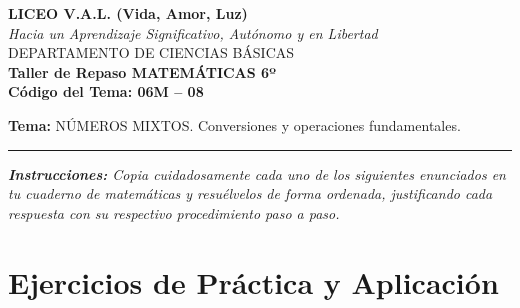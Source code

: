 \documentclass[12pt, letterpaper]{article}
\begin{document}
	\begin{center}
		{\Large \textbf{LICEO V.A.L. (Vida, Amor, Luz)}}\\[0.1cm]
		{\normalsize \textit{Hacia un Aprendizaje Significativo, Autónomo y en Libertad}}\\[0.2cm]
		{\large DEPARTAMENTO DE CIENCIAS BÁSICAS}\\[0.1cm]
		\textbf{Taller de Repaso MATEMÁTICAS 6º}\\[0.1cm]
		\textbf{Código del Tema: 06M – 08}\\[0.1cm]
	\end{center}
	
	\vspace{0.2cm}
	\noindent \textbf{Tema:} NÚMEROS MIXTOS. Conversiones y operaciones fundamentales.
	\vspace{0.2cm}
	\hrule
	\vspace{0.4cm}
	
	\noindent \textit{\textbf{Instrucciones:} Copia cuidadosamente cada uno de los siguientes enunciados en tu cuaderno de matemáticas y resuélvelos de forma ordenada, justificando cada respuesta con su respectivo procedimiento paso a paso.}
	\vspace{0.6cm}
	
	\section*{Ejercicios de Práctica y Aplicación}
	
\end{document}

